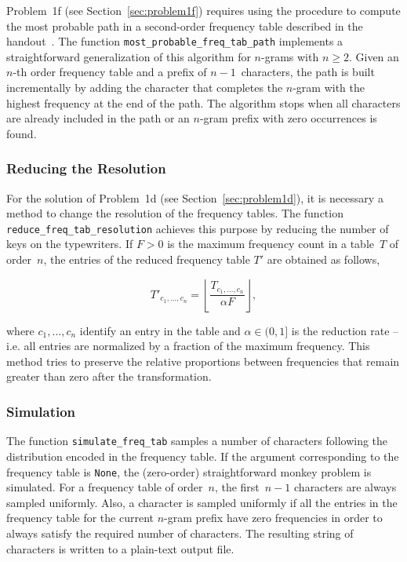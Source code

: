 \documentclass[conference]{IEEEtran}
\newcommand{\codeinline}[1]{{\fontsize{8}{0}\selectfont\texttt{#1}}}
\begin{document}
Problem~1f (see Section~\ref{sec:problem1f}) requires using the procedure to compute the most probable path in a second-order frequency table described in the handout~\cite{Bennett1976}.
The function \codeinline{most\_probable\_freq\_tab\_path} implements a straightforward generalization of this algorithm for $n$-grams with $n\geq2$.
Given an $n$-th order frequency table and a prefix of $n-1$~characters, the path is built incrementally by adding the character that completes the $n$-gram with the highest frequency at the end of the path.
The algorithm stops when all characters are already included in the path or an $n$-gram prefix with zero occurrences is found.

\vspace{0.5em}
\subsubsection{Reducing the Resolution}

For the solution of Problem~1d (see Section~\ref{sec:problem1d}), it is necessary a method to change the resolution of the frequency tables.
The function \codeinline{reduce\_freq\_tab\_resolution} achieves this purpose by reducing the number of keys on the typewriters.
If $F>0$ is the maximum frequency count in a table~$T$ of order~$n$, the entries of the reduced frequency table $T'$ are obtained as follows,

$$T'_{c_1,\ldots,c_n} = \left\lfloor\frac{T_{c_1,\ldots,c_n}}{\alpha F}\right\rfloor,$$

\noindent where $c_1,\ldots,c_n$ identify an entry in the table and $\alpha \in (0,1]$ is the reduction rate 
-- i.e. all entries are normalized by a fraction of the maximum frequency.
This method tries to preserve the relative proportions between frequencies that remain greater than zero after the transformation.


\vspace{0.5em}
\subsubsection{Simulation}

The function \codeinline{simulate\_freq\_tab} samples a number of characters following the distribution encoded in the frequency table.
If the argument corresponding to the frequency table is \codeinline{None}, the (zero-order) straightforward monkey problem is simulated.
For a frequency table of order~$n$, the first~$n-1$ characters are always sampled uniformly.
Also, a character is sampled uniformly if all the entries in the frequency table for the current $n$-gram prefix have zero frequencies in order to always satisfy the required number of characters.
The resulting string of characters is written to a plain-text output file.
\end{document}
